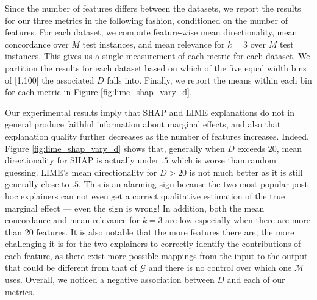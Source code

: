 \documentclass[12pt]{article}  %
\newcommand{\mG}{\mathcal{G}}
\newcommand{\mM}{\mathcal{M}}
\begin{document}
        Since the number of features differs between the datasets, we report the results for our three metrics in the following fashion, conditioned on the number of features. %
        For each dataset, we compute feature-wise mean directionality, mean concordance over $M$ test instances, and mean relevance for $k=3$ over $M$ test instances. This gives us a single measurement of each metric for each dataset. We partition the results for each dataset based on which of the five equal width bins of [1,100] the associated $D$ falls into. Finally, we report the means within each bin for each metric in Figure \ref{fig:lime_shap_vary_d}.  %

    
    Our experimental results imply that SHAP and LIME explanations do not in general produce faithful information about marginal effects, and also that explanation quality further decreases as the number of features increases. Indeed, Figure \ref{fig:lime_shap_vary_d} shows that, generally when $D$ exceeds $20$, mean directionality for SHAP is actually under $.5$ which is worse than random guessing. LIME's mean directionality for $D> 20$ is not much better as it is still generally close to $.5$. This is an alarming sign because the two most popular post hoc explainers can not even get a correct qualitative estimation of the true marginal effect --- even the sign is wrong! In addition, both the mean concordance and mean relevance for $k=3$ are low especially when there are more than 20 features. It is also notable that the more features there are, the more challenging it is for the two explainers to correctly identify the contributions of each feature, as there exist more possible mappings from the input to the output that could be different from that of $\mG$ and there is no control over which one $\mM$ uses. Overall, we noticed a negative association between $D$ and each of our metrics. 
\end{document}
